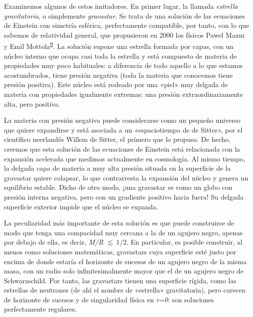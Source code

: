 Examinemos algunos de estos imitadores. En primer lugar, la llamada \emph{estrella gravitatoria}, o simplemente \emph{gravastar}. Se trata de una solución de las ecuaciones de Einstein con simetría esférica, perfectamente compatible, por tanto, con lo que sabemos de relatividad general, que propusieron en 2000 los físicos Pawel Mazur y Emil Mottola\textsuperscript{\hyperlink{note:06-09}{9}}. La solución supone una estrella formada por capas, con un núcleo interno que ocupa casi toda la estrella y está compuesto de materia de propiedades muy poco habituales: a diferencia de todo aquello a lo que estamos acostumbrados, tiene presión negativa (toda la materia que conocemos tiene presión positiva). Este núcleo está rodeado por una «piel» muy delgada de materia con propiedades igualmente extremas: una presión extraordinariamente alta, pero positiva.

La materia con presión negativa puede considerarse como un pequeño universo que quiere expandirse y está asociada a un «espaciotiempo de de Sitter», por el científico neerlandés Willem de Sitter, el primero que lo propuso. De hecho, creemos que esta solución de las ecuaciones de Einstein está relacionada con la expansión acelerada que medimos actualmente en cosmología. Al mismo tiempo, la delgada capa de materia a muy alta presión situada en la superficie de la gravastar quiere colapsar, lo que contrarresta la expansión del núcleo y genera un equilibrio estable. Dicho de otro modo, ¡una gravastar es como un globo con presión interna negativa, pero con un gradiente positivo hacia fuera! Su delgada superficie exterior impide que el núcleo se expanda.

La peculiaridad más importante de esta solución es que puede construirse de modo que tenga una compacidad muy cercana a la de un agujero negro, apenas por debajo de ella, es decir, \emph{M/R} \(\lesssim \ 1/2\). En particular, es posible construir, al menos como soluciones matemáticas, gravastars cuya superficie esté justo por encima de donde estaría el horizonte de sucesos de un agujero negro de la misma masa, con un radio solo infinitesimalmente mayor que el de un agujero negro de Schwarzschild. Por tanto, las gravastars tienen una superficie rígida, como las estrellas de neutrones (de ahí el nombre de «estrella» gravitatoria), pero carecen de horizonte de sucesos y de singularidad física en \emph{r=0}: son soluciones perfectamente regulares.

